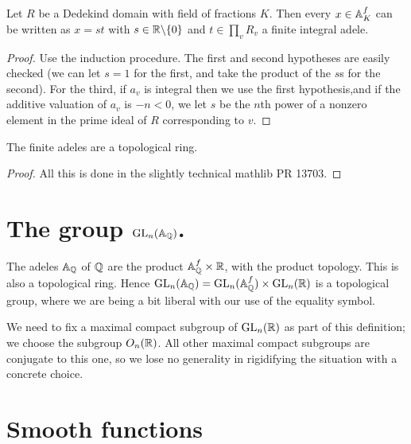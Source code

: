 \begin{theorem}
  \label{DedekindDomain.FiniteAdeleRing.clear_denominator}
  \leanok
Let $R$ be a Dedekind domain with field of fractions $K$. Then every $x\in\mathbb{A}_K^f$ can
be written as $x=st$ with $s\in\mathbb{R}\backslash\{0\}$ and $t\in\prod_v R_v$ a finite integral adele.
\end{theorem}
\begin{proof}
  Use the induction procedure. The first and second hypotheses are easily checked
  (we can let $s=1$ for the first, and take the product of the $s$s for the second).
  For the third, if $a_v$ is integral then we use the first hypothesis,and if the
  additive valuation of $a_v$ is $-n<0$, we let $s$ be the $n$th power of a nonzero
  element in the prime ideal of $R$ corresponding to $v$.
\end{proof}

\begin{corollary}
  \label{instTopologicalRingFiniteAdeleRing}
  \leanok
  The finite adeles are a topological ring.
\end{corollary}
\begin{proof} All this is done in the slightly technical mathlib PR 13703.
  \leanok
\end{proof}

\section[The adelic general linear group]{The group $\operatorname{GL}_n(\mathbb{A}_{\mathbb{Q}})$.}

The adeles $\mathbb{A}_{\mathbb{Q}}$ of $\mathbb{Q}$ are the product $\mathbb{A}_{\mathbb{Q}}^f\times\mathbb{R}$, with the product topology. This
is also a topological ring. Hence $\operatorname{GL}_n(\mathbb{A}_{\mathbb{Q}})=\operatorname{GL}_n(\mathbb{A}_{\mathbb{Q}}^f)\times\operatorname{GL}_n(\mathbb{R})$ is a
topological group, where we are being a bit liberal with our use of the equality symbol.

We need to fix a maximal compact subgroup of $\operatorname{GL}_n(\mathbb{R})$ as part of this definition;
we choose the subgroup $O_n(\mathbb{R})$. All other maximal compact subgroups are conjugate
to this one, so we lose no generality in rigidifying the situation with a concrete choice.

\section{Smooth functions}

